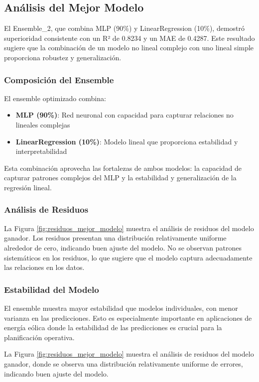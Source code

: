 \documentclass[conference]{IEEEtran}
\begin{document}
	\subsection{Análisis del Mejor Modelo}
	El Ensemble\_2, que combina MLP (90\%) y LinearRegression (10\%), demostró superioridad consistente con un R² de 0.8234 y un MAE de 0.4287. Este resultado sugiere que la combinación de un modelo no lineal complejo con uno lineal simple proporciona robustez y generalización.
	
	\subsubsection{Composición del Ensemble}
	El ensemble optimizado combina:
	\begin{itemize}
		\item \textbf{MLP (90\%)}: Red neuronal con capacidad para capturar relaciones no lineales complejas
		\item \textbf{LinearRegression (10\%)}: Modelo lineal que proporciona estabilidad y interpretabilidad
	\end{itemize}
	
	Esta combinación aprovecha las fortalezas de ambos modelos: la capacidad de capturar patrones complejos del MLP y la estabilidad y generalización de la regresión lineal.
	
	\subsubsection{Análisis de Residuos}
	La Figura \ref{fig:residuos_mejor_modelo} muestra el análisis de residuos del modelo ganador. Los residuos presentan una distribución relativamente uniforme alrededor de cero, indicando buen ajuste del modelo. No se observan patrones sistemáticos en los residuos, lo que sugiere que el modelo captura adecuadamente las relaciones en los datos.
	
	\subsubsection{Estabilidad del Modelo}
	El ensemble muestra mayor estabilidad que modelos individuales, con menor varianza en las predicciones. Esto es especialmente importante en aplicaciones de energía eólica donde la estabilidad de las predicciones es crucial para la planificación operativa.
	
	La Figura \ref{fig:residuos_mejor_modelo} muestra el análisis de residuos del modelo ganador, donde se observa una distribución relativamente uniforme de errores, indicando buen ajuste del modelo.
	
\end{document}
